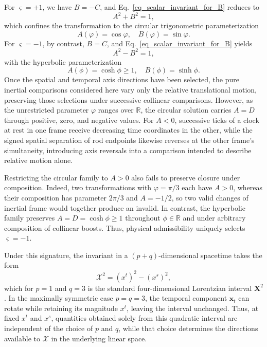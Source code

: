 For $\varsigma = +1$, we have $B = -C$, and Eq.~\eqref{eq_scalar_invariant_for_B} reduces to
\begin{equation}
    A^{2} + B^{2} = 1,
\end{equation}
which confines the transformation to the circular trigonometric parameterization
\begin{equation}
    A(\varphi) = \cos\varphi,\quad B(\varphi) = \sin\varphi.
\end{equation}
For $\varsigma = -1$, by contrast, $B = C$, and Eq.~\eqref{eq_scalar_invariant_for_B} yields
\begin{equation}
    A^{2} - B^{2} = 1,
\end{equation}
with the hyperbolic parameterization
\begin{equation}
    A(\phi) = \cosh\phi \ge 1,\quad B(\phi) = \sinh\phi.
\end{equation}
Once the spatial and temporal axis directions have been selected, the pure inertial comparisons considered here vary only the relative translational motion, preserving those selections under successive collinear comparisons. However, as the unrestricted parameter $\varphi$ ranges over $\mathbb{R}$, the circular solution carries $A=D$ through positive, zero, and negative values. For $A<0$, successive ticks of a clock at rest in one frame receive decreasing time coordinates in the other, while the signed spatial separation of rod endpoints likewise reverses at the other frame's simultaneity\cite{Data2022_RevisitLorentzTransform}, introducing axis reversals into a comparison intended to describe relative motion alone.

Restricting the circular family to $A>0$ also fails to preserve closure under composition. Indeed, two transformations with $\varphi=\pi/3$ each have $A>0$, whereas their composition has parameter $2\pi/3$ and $A=-1/2$, so two valid changes of inertial frame would together produce an invalid. In contrast, the hyperbolic family preserves $A=D=\cosh\phi\ge1$ throughout $\phi\in\mathbb{R}$ and under arbitrary composition of collinear boosts. Thus, physical admissibility uniquely selects $\varsigma=-1$.

Under this signature, the invariant in a $(p+q)$-dimensional spacetime takes the form
\begin{equation}\label{eq_lorentz_interval}
    \boldsymbol{\mathcal{X}}^{2} = (x^{t})^{2} - (x^{s})^{2},
\end{equation}
which for $p=1$ and $q=3$ is the standard four-dimensional Lorentzian interval $\mathbf{X}^{2}$. In the maximally symmetric case $p=q=3$, the temporal component $\mathbf{x}_{t}$ can rotate while retaining its magnitude $x^{t}$, leaving the interval unchanged. Thus, at fixed $x^{t}$ and $x^{s}$, quantities obtained solely from this quadratic interval are independent of the choice of $p$ and $q$, while that choice determines the directions available to $\boldsymbol{\mathcal{X}}$ in the underlying linear space.


